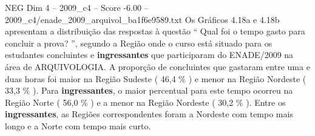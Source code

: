 \begin{textsample}{NEG Dim 4 – 2009\_c4 – Score -6.00 – 2009\_c4/enade\_2009\_arquivol\_ba1f6e9589.txt}
Os Gráficos 4.18a e 4.18b apresentam a distribuição das respostas à questão “ Qual foi o tempo gasto para concluir a prova? ”, segundo a Região onde o curso está situado para os estudantes concluintes e \textbf{ingressantes} que participaram do ENADE/2009 na área de ARQUIVOLOGIA.
A proporção de concluintes que gastaram entre uma e duas horas foi maior na Região Sudeste ( 46,4 \% ) e menor na Região Nordeste ( 33,3 \% ).
Para \textbf{ingressantes}, o maior percentual para este tempo ocorreu na Região Norte ( 56,0 \% ) e a menor na Região Nordeste ( 30,2 \% ).
Entre os \textbf{ingressantes}, as Regiões correspondentes foram a Nordeste com tempo mais longo e a Norte com tempo mais curto.

\end{textsample}
